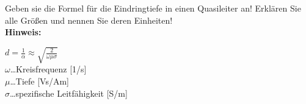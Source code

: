 \begin{question}[section=3,name={Eindringtiefe},difficulty=,quantity=1,type=thr,tags={20130513}]
	Geben sie die Formel für die Eindringtiefe in einen Quasileiter an! Erklären Sie alle Größen und nennen Sie deren Einheiten!
	\\ \textbf{Hinweis:}\\
	
\end{question}
\begin{solution}
	$d=\frac{1}{\alpha}\approx \sqrt{\frac{2}{\omega\mu\sigma}}$\\
	$\omega$\dots Kreisfrequenz [1/s]\\
	$\mu$\dots Tiefe [Vs/Am]\\
	$\sigma$\dots spezifische Leitfähigkeit [S/m]\\
	
\end{solution}
